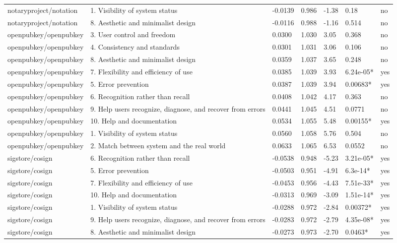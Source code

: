 \begin{table}[t]
\begin{tabular}{lllllll}
notaryproject/notation & 1. Visibility of system status & -0.0139 & 0.986 & -1.38 & 0.18 & no \\
notaryproject/notation & 8. Aesthetic and minimalist design & -0.0116 & 0.988 & -1.16 & 0.514 & no \\
openpubkey/openpubkey & 3. User control and freedom & 0.0300 & 1.030 & 3.05 & 0.368 & no \\
openpubkey/openpubkey & 4. Consistency and standards & 0.0301 & 1.031 & 3.06 & 0.106 & no \\
openpubkey/openpubkey & 8. Aesthetic and minimalist design & 0.0359 & 1.037 & 3.65 & 0.248 & no \\
openpubkey/openpubkey & 7. Flexibility and efficiency of use & 0.0385 & 1.039 & 3.93 & 6.24e-05* & yes \\
openpubkey/openpubkey & 5. Error prevention & 0.0387 & 1.039 & 3.94 & 0.00683* & yes \\
openpubkey/openpubkey & 6. Recognition rather than recall & 0.0408 & 1.042 & 4.17 & 0.363 & no \\
openpubkey/openpubkey & 9. Help users recognize, diagnose, and recover from errors & 0.0441 & 1.045 & 4.51 & 0.0771 & no \\
openpubkey/openpubkey & 10. Help and documentation & 0.0534 & 1.055 & 5.48 & 0.00155* & yes \\
openpubkey/openpubkey & 1. Visibility of system status & 0.0560 & 1.058 & 5.76 & 0.504 & no \\
openpubkey/openpubkey & 2. Match between system and the real world & 0.0633 & 1.065 & 6.53 & 0.0552 & no \\
sigstore/cosign & 6. Recognition rather than recall & -0.0538 & 0.948 & -5.23 & 3.21e-05* & yes \\
sigstore/cosign & 5. Error prevention & -0.0503 & 0.951 & -4.91 & 6.3e-14* & yes \\
sigstore/cosign & 7. Flexibility and efficiency of use & -0.0453 & 0.956 & -4.43 & 7.51e-33* & yes \\
sigstore/cosign & 10. Help and documentation & -0.0313 & 0.969 & -3.09 & 1.51e-14* & yes \\
sigstore/cosign & 1. Visibility of system status & -0.0288 & 0.972 & -2.84 & 0.00372* & yes \\
sigstore/cosign & 9. Help users recognize, diagnose, and recover from errors & -0.0283 & 0.972 & -2.79 & 4.35e-08* & yes \\
sigstore/cosign & 8. Aesthetic and minimalist design & -0.0273 & 0.973 & -2.70 & 0.0463* & yes \\

\end{tabular}
\end{table}
